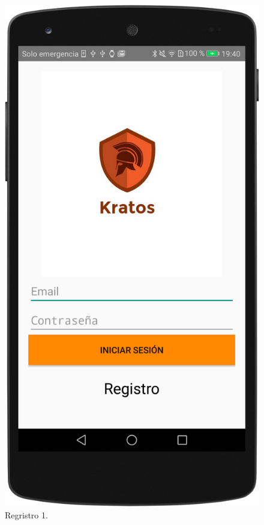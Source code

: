 \begin{figure}[H]
	\centering
	\includegraphics[scale=0.10]{imagenes/m1.png}
	\caption{Regristro 1.}
	\label{Regristro 1}
\end{figure}

